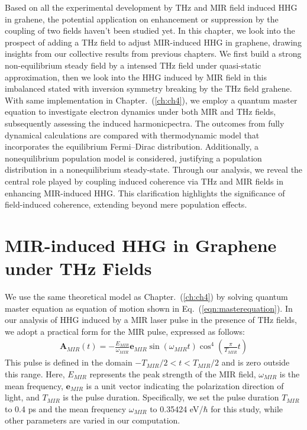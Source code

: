 Based on all the experimental development by THz and MIR field induced HHG in grahene, the potential application on enhancement or suppression by the coupling of two fields haven't been studied yet. In this chapter, we look into the prospect of adding a THz field to adjust MIR-induced \gls{HHG} in graphene, drawing insights from our collective results from previous chapters. We first build a strong non-equilibrium steady field by a intensed THz field under quasi-static approximation, then we look into the HHG induced by MIR field in this imbalanced stated with inversion symmetry breaking by the THz field grahene. With same implementation in Chapter.~(\ref{ch:ch4}), we employ a quantum master equation to investigate electron dynamics under both MIR and THz fields, subsequently assessing the induced harmonicpectra. The outcomes from fully dynamical calculations are compared with thermodynamic model that incorporates the equilibrium Fermi--Dirac distribution. Additionally, a nonequilibrium population model is considered, justifying a population distribution in a nonequilibrium steady-state. Through our analysis, we reveal the central role played by coupling induced coherence via THz and MIR fields in enhancing MIR-induced HHG. This clarification highlights the significance of field-induced coherence, extending beyond mere population effects.
\section{MIR-induced HHG in Graphene under THz Fields}
We use the same theoretical model as Chapter.~(\ref{ch:ch4}) by solving quantum master equation as
equation of motion shown in Eq.~(\ref{eqn:masterequation}).
In our analysis of \gls{HHG} induced by a MIR laser pulse in the presence of THz fields, we adopt a practical form for the MIR pulse, expressed as follows:
\begin{align}
	\mathbf A_{MIR}(t) = -\frac{E_{MIR}}{\omega_{MIR}} \mathbf{e}_{MIR}
	\sin(\omega_{MIR} t) \cos^4 \left (\frac{\pi}{T_{MIR}} t \right)
	\label{eqn:laser_pulse}
\end{align}
This pulse is defined in the domain $-T_{MIR}/2<t<T_{MIR}/2$ and is zero outside this range.
Here, $E_{MIR}$ represents the peak strength of the MIR field, $\omega_{MIR}$ is the mean
frequency, $\mathbf e_{MIR}$ is a unit vector indicating the polarization direction of light, and
$T_{MIR}$ is the pulse duration. Specifically, we set the pulse duration $T_{MIR}$ to 0.4 ps and
the mean frequency $\omega_{MIR}$ to 0.35424 eV/$\hbar$ for this study, while other parameters are
varied in our computation.

